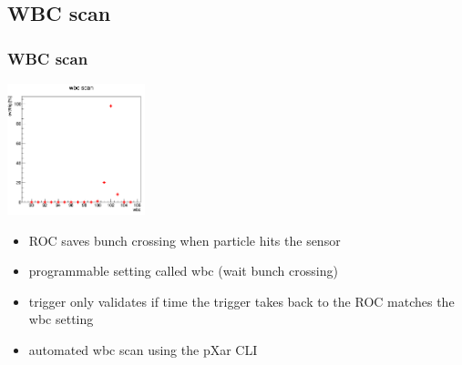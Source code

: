 \documentclass[9pt]{beamer}
\begin{document}
\subsection{WBC scan}
\begin{frame}
	\frametitle{WBC scan}
	\begin{center}
		\begin{minipage}{4.0cm}
			\centering
			\includegraphics[width=4.0cm]{Pics/wbcscan2}
		\end{minipage}
		\hspace*{2pt}
		\begin{minipage}[c][.7\textheight]{7cm}
			\begin{itemize}
				\setlength{\itemsep}{\fill}
				\item ROC saves bunch crossing when particle hits the sensor
				\item programmable setting called wbc (wait bunch crossing)
				\item trigger only validates if time the trigger takes back to the ROC matches the wbc setting
				\item automated wbc scan using the pXar CLI
			\end{itemize}
		\end{minipage}\no\s
	\end{center}
\end{frame}
\end{document}
